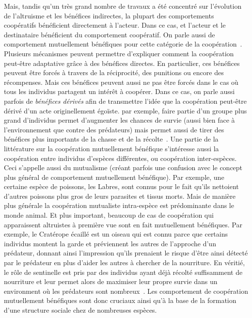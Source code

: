 		Mais, tandis qu'un très grand nombre de travaux a été concentré sur l'évolution de l'altruisme et les bénéfices indirectes, la plupart des comportements coopératifs bénéficient directement à l'acteur. Dans ce cas, et l'acteur et le destinataire bénéficient du comportement coopératif. On parle aussi de comportement mutuellement bénéfiques pour cette catégorie de la coopération~\parencite{Bergmuller2007a}. Plusieurs mécanismes peuvent permettre d'expliquer comment la coopération peut-être adaptative grâce à des bénéfices directes. En particulier, ces bénéfices peuvent être forcés à travers de la réciprocité, des punitions ou encore des récompenses. Mais ces bénéfices peuvent aussi ne pas être forcés dans le cas où tous les individus partagent un intérêt à coopérer. Dans ce cas, on parle aussi parfois de \emph{bénéfices dérivés} afin de transmettre l'idée que la coopération peut-être dérivé d'un acte originellement égoïste. par exemple, faire partie d'un groupe plus grand d'individus permet d'augmenter les chances de survie (aussi bien face à l'environnement que contre des prédateurs) mais permet aussi de tirer des bénéfices plus importants de la chasse et de la récolte~\parencite{Clutton-Brock2002}. Une partie de la littérature sur la coopération mutuellement bénéfique s'intéresse aussi la coopération entre individus d'espèces différentes, ou coopération inter-espèces. Ceci s'appelle aussi du mutualisme (créant parfois une confusion avec le concept plus général de comportement mutuellement bénéfique). Par exemple, une certaine espèce de poissons, les Labres, sont connus pour le fait qu'ils nettoient d'autres poissons plus gros de leurs parasites et tissus morts. Mais de manière plus générale la coopération mutualiste intra-espèce est prédominante dans le monde animal. Et plus important, beaucoup de cas de coopération qui apparaissent altruistes à première vue sont en fait mutuellement bénéfiques. Par exemple, le Cratérope écaillé est un oiseau qui est connu parce que certains individus montent la garde et préviennent les autres de l'approche d'un prédateur, donnant ainsi l'impression qu'ils prenaient le risque d'être ainsi détecté par le prédateur en plus d'aider les autres à chercher de la nourriture. En véritié, le rôle de sentinelle est pris par des individus ayant déjà récolté suffisamment de nourriture et leur permet alors de maximiser leur propre survie dans un environment où les prédateurs sont nombreux~\parencite{Wright2001, Clutton-Brock2002}. Les comportement de coopération mutuellement bénéfiques sont donc cruciaux ainsi qu'à la base de la formation d'une structure sociale chez de nombreuses espèces.

